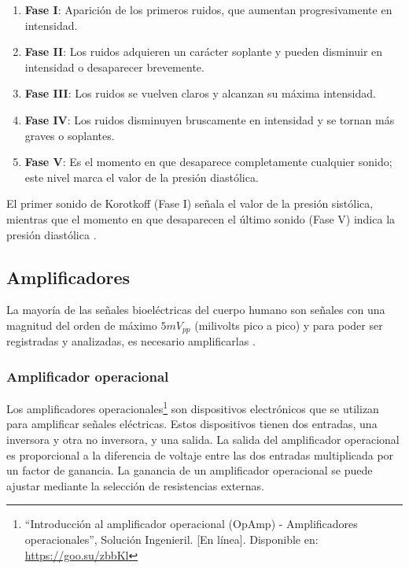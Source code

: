         \begin{enumerate}
            \item \textbf{Fase I}: Aparición de los primeros ruidos, que aumentan progresivamente en intensidad.
            \item \textbf{Fase II}: Los ruidos adquieren un carácter soplante y pueden disminuir en intensidad o desaparecer brevemente.
            \item \textbf{Fase III}: Los ruidos se vuelven claros y alcanzan su máxima intensidad.
            \item \textbf{Fase IV}: Los ruidos disminuyen bruscamente en intensidad y se tornan más graves o soplantes.
            \item \textbf{Fase V}: Es el momento en que desaparece completamente cualquier sonido; este nivel marca el valor de la presión diastólica.
        \end{enumerate}

        El primer sonido de Korotkoff (Fase I) señala el valor de la presión sistólica, mientras que el momento en que desaparecen el último sonido (Fase V) indica la presión diastólica \cite{Gill_2018}. 


    \subsection{Amplificadores}
    La mayoría de las señales bioeléctricas del cuerpo humano son señales con una magnitud del orden de máximo $5 mV_{pp}$ (milivolts pico a pico) y para poder ser registradas y analizadas, es necesario amplificarlas \cite{Diaz_amplificacion_señales}.

        \subsubsection{Amplificador operacional}
            Los amplificadores operacionales\footnote{``Introducción al amplificador operacional (OpAmp) - Amplificadores operacionales'', Solución Ingenieril. [En línea]. Disponible en: \url{https://goo.su/zbbKl}} son dispositivos electrónicos que se utilizan para amplificar señales eléctricas. Estos dispositivos tienen dos entradas, una inversora y otra no inversora, y una salida. La salida del amplificador operacional es proporcional a la diferencia de voltaje entre las dos entradas multiplicada por un factor de ganancia. La ganancia de un amplificador operacional se puede ajustar mediante la selección de resistencias externas.

